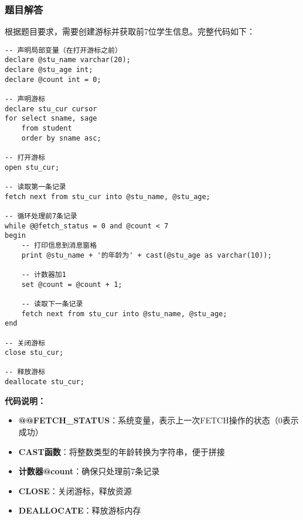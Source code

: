 \subsubsection{题目解答}

\qquad 根据题目要求，需要创建游标并获取前7位学生信息。完整代码如下：

\begin{mdframed}[backgroundcolor=blue!5]
\begin{verbatim}
-- 声明局部变量（在打开游标之前）
declare @stu_name varchar(20);
declare @stu_age int;
declare @count int = 0;

-- 声明游标
declare stu_cur cursor
for select sname, sage
    from student
    order by sname asc;

-- 打开游标
open stu_cur;

-- 读取第一条记录
fetch next from stu_cur into @stu_name, @stu_age;

-- 循环处理前7条记录
while @@fetch_status = 0 and @count < 7
begin
    -- 打印信息到消息窗格
    print @stu_name + '的年龄为' + cast(@stu_age as varchar(10));

    -- 计数器加1
    set @count = @count + 1;

    -- 读取下一条记录
    fetch next from stu_cur into @stu_name, @stu_age;
end

-- 关闭游标
close stu_cur;

-- 释放游标
deallocate stu_cur;
\end{verbatim}
\end{mdframed}

\textbf{代码说明：}
\begin{itemize}
  \item \textbf{@@FETCH\_STATUS}：系统变量，表示上一次FETCH操作的状态（0表示成功）
  \item \textbf{CAST函数}：将整数类型的年龄转换为字符串，便于拼接
  \item \textbf{计数器@count}：确保只处理前7条记录
  \item \textbf{CLOSE}：关闭游标，释放资源
  \item \textbf{DEALLOCATE}：释放游标内存
\end{itemize}
